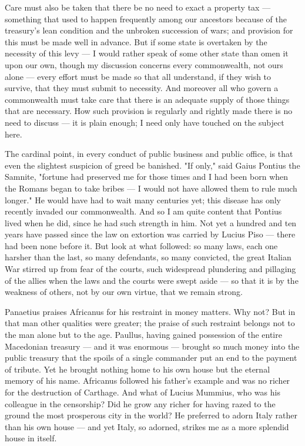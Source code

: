  Care must also be taken that there be no need to exact a property tax — something that used to happen frequently among our ancestors because of the treasury's lean condition and the unbroken succession of wars; and provision for this must be made well in advance. But if some state is overtaken by the necessity of this levy — I would rather speak of some other state than omen it upon our own, though my discussion concerns every commonwealth, not ours alone — every effort must be made so that all understand, if they wish to survive, that they must submit to necessity. And moreover all who govern a commonwealth must take care that there is an adequate supply of those things that are necessary. How such provision is regularly and rightly made there is no need to discuss — it is plain enough; I need only have touched on the subject here.

 The cardinal point, in every conduct of public business and public office, is that even the slightest suspicion of greed be banished. "If only," said Gaius Pontius the Samnite, "fortune had preserved me for those times and I had been born when the Romans began to take bribes — I would not have allowed them to rule much longer." He would have had to wait many centuries yet; this disease has only recently invaded our commonwealth. And so I am quite content that Pontius lived when he did, since he had such strength in him. Not yet a hundred and ten years have passed since the law on extortion was carried by Lucius Piso — there had been none before it. But look at what followed: so many laws, each one harsher than the last, so many defendants, so many convicted, the great Italian War stirred up from fear of the courts, such widespread plundering and pillaging of the allies when the laws and the courts were swept aside — so that it is by the weakness of others, not by our own virtue, that we remain strong.

 Panaetius praises Africanus for his restraint in money matters. Why not? But in that man other qualities were greater; the praise of such restraint belongs not to the man alone but to the age. Paullus, having gained possession of the entire Macedonian treasury — and it was enormous — brought so much money into the public treasury that the spoils of a single commander put an end to the payment of tribute. Yet he brought nothing home to his own house but the eternal memory of his name. Africanus followed his father's example and was no richer for the destruction of Carthage. And what of Lucius Mummius, who was his colleague in the censorship? Did he grow any richer for having razed to the ground the most prosperous city in the world? He preferred to adorn Italy rather than his own house — and yet Italy, so adorned, strikes me as a more splendid house in itself.

